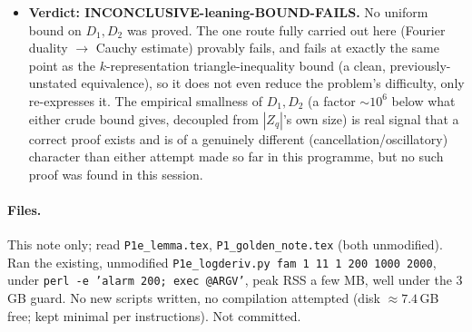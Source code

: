 \documentclass[11pt]{article}
\theoremstyle{remark}\newtheorem{remark}[theorem]{Remark}
\begin{document}
\begin{itemize}
\item \textbf{Verdict: INCONCLUSIVE-leaning-BOUND-FAILS.} No uniform bound on $D_1,D_2$ was proved. The one route fully carried out here (Fourier duality $\to$ Cauchy estimate) provably fails, and fails at exactly the same point as the $k$-representation triangle-inequality bound (a clean, previously-unstated equivalence), so it does not even reduce the problem's difficulty, only re-expresses it. The empirical smallness of $D_1,D_2$ (a factor $\sim10^6$ below what either crude bound gives, decoupled from $|Z_q|$'s own size) is real signal that a correct proof exists and is of a genuinely different (cancellation/oscillatory) character than either attempt made so far in this programme, but no such proof was found in this session.
\end{itemize}

\paragraph{Files.} This note only; read \texttt{P1e\_lemma.tex}, \texttt{P1\_golden\_note.tex} (both unmodified). Ran the existing, unmodified \texttt{P1e\_logderiv.py fam 1 11 1 200 1000 2000}, under \texttt{perl -e 'alarm 200; exec @ARGV'}, peak RSS a few MB, well under the 3\,GB guard. No new scripts written, no compilation attempted (disk $\approx7.4$\,GB free; kept minimal per instructions). Not committed.
\end{document}

